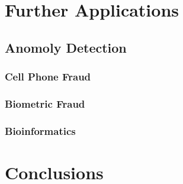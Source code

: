 \documentclass[midd]{thesis}
\begin{document}
\chapter{Further Applications}
\label{sec:future}


\section{Anomoly Detection}

\subsection{Cell Phone Fraud}

\subsection{Biometric Fraud}

\subsection{Bioinformatics}

\pagebreak
\chapter{Conclusions}




\end{document}
